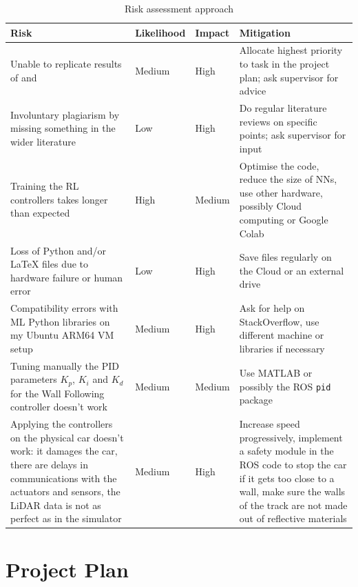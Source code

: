 \begin{table}
\centering
\begin{tabularx}{\textwidth}{||X|X|X|X||} 
 \hline
 Risk & Likelihood & Impact & Mitigation\\ [0.5ex] 
 \hline\hline
 Unable to replicate results of \cite{bosello} and \cite{Reference4} & Medium & High & Allocate highest priority to task in the project plan; ask supervisor for advice\\
 \hline
  Involuntary plagiarism by missing something in the wider literature & Low & High & Do regular literature reviews on specific points; ask supervisor for input\\
  
  \hline
  Training the RL controllers takes longer than expected & High & Medium & Optimise the code, reduce the size of NNs, use other hardware, possibly Cloud computing or Google Colab\\ [1ex]

 \hline
  Loss of Python and/or \LaTeX $ $ files due to hardware failure or human error& Low & High & Save files regularly on the Cloud or an external drive\\ [1ex]
 
   \hline
  Compatibility errors with ML Python libraries on my Ubuntu ARM64 VM setup & Medium & High & Ask for help on StackOverflow, use different machine or libraries if necessary\\
  
   \hline
  Tuning manually the PID parameters $K_p$, $K_i$ and $K_d$ for the Wall Following controller doesn't work & Medium & Medium & Use MATLAB or possibly the ROS \verb |pid| package\\
  
 \hline
    Applying the controllers on the physical car doesn't work: it damages the car, there are delays in communications with the actuators and sensors, the LiDAR data is not as perfect as in the simulator & Medium & High & Increase speed progressively, implement a safety module in the ROS code to stop the car if it gets too close to a wall, make sure the walls of the track are not made out of reflective materials\\ [1ex]
   
 \hline
 
\end{tabularx}
\caption{Risk assessment approach}
\label{risktab}
\end{table}


\section{Project Plan}
\label{propla}


